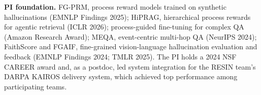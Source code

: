 \documentclass[11pt]{article}
\newcommand{\head}[1]{{\color{navy}\textbf{#1}}\enspace}
\begin{document}
\head{PI foundation.} FG-PRM, process reward models trained on synthetic hallucinations (EMNLP Findings 2025); HiPRAG, hierarchical process rewards for agentic retrieval (ICLR 2026); process-guided fine-tuning for complex QA (Amazon Research Award); MEQA, event-centric multi-hop QA (NeurIPS 2024); FaithScore and FGAIF, fine-grained vision-language hallucination evaluation and feedback (EMNLP Findings 2024; TMLR 2025). The PI holds a 2024 NSF CAREER award and, as a postdoc, led system integration for the RESIN team's DARPA KAIROS delivery system, which achieved top performance among participating teams.
\end{document}
